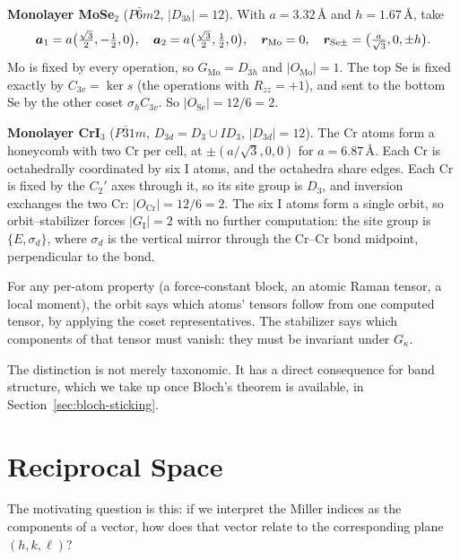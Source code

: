 \begin{example}
\textbf{Monolayer MoSe$_2$} ($P\bar{6}m2$, $|D_{3h}| = 12$). With $a = 3.32$\,\AA{} and $h = 1.67$\,\AA, take
\[
    \bm{a}_1 = a\bigl(\tfrac{\sqrt3}{2},-\tfrac12,0\bigr),\quad \bm{a}_2 = a\bigl(\tfrac{\sqrt3}{2},\tfrac12,0\bigr),\quad
    \bm{r}_{\text{Mo}} = 0,\quad \bm{r}_{\text{Se}\pm} = \bigl(\tfrac{a}{\sqrt3},0,\pm h\bigr).
\]
Mo is fixed by every operation, so $G_{\text{Mo}} = D_{3h}$ and $|O_{\text{Mo}}| = 1$. The top Se is fixed exactly by $C_{3v} = \ker s$ (the operations with $R_{zz} = +1$), and sent to the bottom Se by the other coset $\sigma_hC_{3v}$. So $|O_{\text{Se}}| = 12/6 = 2$.

\textbf{Monolayer CrI$_3$} ($P\bar{3}1m$, $D_{3d} = D_3\cup ID_3$, $|D_{3d}| = 12$). The Cr atoms form a honeycomb with two Cr per cell, at $\pm(a/\sqrt3,0,0)$ for $a = 6.87$\,\AA. Each Cr is octahedrally coordinated by six I atoms, and the octahedra share edges. Each Cr is fixed by the $C_2'$ axes through it, so its site group is $D_3$, and inversion exchanges the two Cr: $|O_{\text{Cr}}| = 12/6 = 2$. The six I atoms form a single orbit, so orbit--stabilizer forces $|G_{\text{I}}| = 2$ with no further computation: the site group is $\{E,\sigma_d\}$, where $\sigma_d$ is the vertical mirror through the Cr--Cr bond midpoint, perpendicular to the bond.
\end{example}

\begin{fact}
For any per-atom property (a force-constant block, an atomic Raman tensor, a local moment), the orbit says which atoms' tensors follow from one computed tensor, by applying the coset representatives. The stabilizer says which components of that tensor must vanish: they must be invariant under $G_\kappa$.
\end{fact}


The distinction is not merely taxonomic. It has a direct consequence for band structure, which we take up once Bloch's theorem is available, in Section~\ref{sec:bloch-sticking}.

\section{Reciprocal Space}
\label{sec:xrd-reciprocal}

The motivating question is this: if we interpret the Miller indices as the components of a vector, how does that vector relate to the corresponding plane $(h,k,\ell)$?

